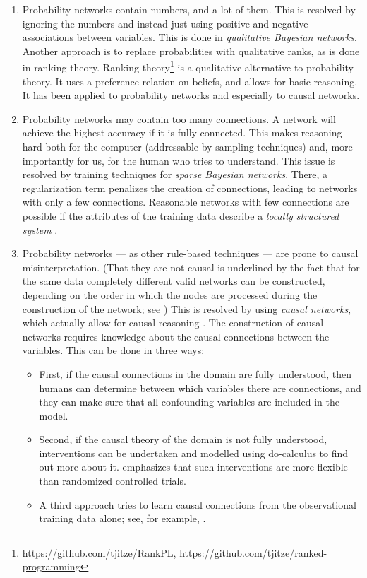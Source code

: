 \begin{enumerate}
\item Probability networks contain numbers, and a lot of them. This is resolved by ignoring the numbers and instead just using positive and negative associations between variables. This is done in \textit{qualitative Bayesian networks}. Another approach is to replace probabilities with qualitative ranks, as is done in ranking theory. Ranking theory\footnote{\url{https://github.com/tjitze/RankPL}, \url{https://github.com/tjitze/ranked-programming}}\citep{spohnGeneralNonprobabilisticTheory1990,spohnLawsBeliefRanking2012} is a qualitative alternative to probability theory. It uses a preference relation on beliefs, and allows for basic reasoning. It has been applied to probability networks and especially to causal networks.
\item Probability networks may contain too many connections. A network will achieve the highest accuracy if it is fully connected. This makes reasoning hard both for the computer (addressable by sampling techniques) and, more importantly for us, for the human who tries to understand. This issue is resolved by training techniques for \textit{sparse Bayesian networks}. There, a regularization term penalizes the creation of connections, leading to networks with only a few connections. Reasonable networks with few connections are possible if the attributes of the training data describe a \textit{locally structured system} \cite[p.~516]{russellArtificialIntelligenceModern2010}.
\item Probability networks — as other rule-based techniques — are prone to causal misinterpretation. (That they are not causal is underlined by the fact that for the same data completely different valid networks can be constructed, depending on the order in which the nodes are processed during the construction of the network; see \citet[fig.~14.3]{russellArtificialIntelligenceModern2010}) This is resolved by using \textit{causal networks}, which actually allow for causal reasoning \citep{pearlCausalInferenceStatistics2016}. The construction of causal networks requires knowledge about the causal connections between the variables. This can be done in three ways: 
\begin{itemize}
    \item First, if the causal connections in the domain are fully understood, then humans can determine between which variables there are connections, and they can make sure that all confounding variables are included in the model.
    \item Second, if the causal theory of the domain is not fully understood, interventions can be undertaken and modelled using do-calculus to find out more about it. \citet{pearlCausalInferenceStatistics2016} emphasizes that such interventions are more flexible than randomized controlled trials.
    \item A third approach tries to learn causal connections from the observational training data alone; see, for example, \cite{wallaceCausalDiscoveryMML1996}.
\end{itemize}
\end{enumerate}

